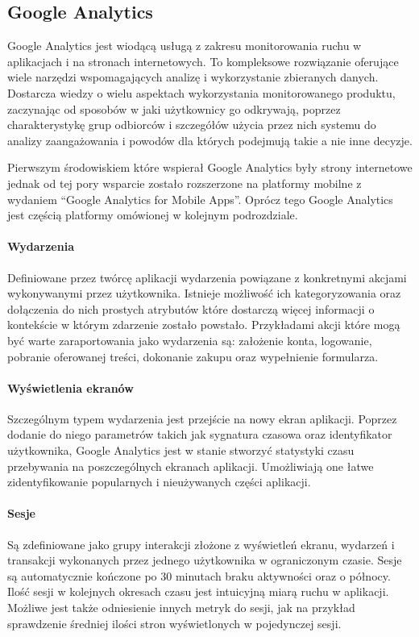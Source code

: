 \subsection{Google Analytics}
\label{sec:ga}
Google Analytics jest wiodącą usługą z zakresu monitorowania ruchu w aplikacjach i na stronach internetowych. To kompleksowe rozwiązanie oferujące wiele narzędzi wspomagających analizę i wykorzystanie zbieranych danych. Dostarcza wiedzy o wielu aspektach wykorzystania monitorowanego produktu, zaczynając od sposobów w jaki użytkownicy go odkrywają, poprzez charakterystykę grup odbiorców i szczegółów użycia przez nich systemu do analizy zaangażowania i powodów dla których podejmują takie a nie inne decyzje.

Pierwszym środowiskiem które wspierał Google Analytics były strony internetowe jednak od tej pory wsparcie zostało rozszerzone na platformy mobilne z wydaniem ``Google Analytics for Mobile Apps''. Oprócz tego Google Analytics jest częścią platformy  omówionej w kolejnym podrozdziale.

\paragraph{Wydarzenia}
\label{par:ga-events}
Definiowane przez twórcę aplikacji wydarzenia powiązane z konkretnymi akcjami wykonywanymi przez użytkownika. Istnieje możliwość ich kategoryzowania oraz dołączenia do nich prostych atrybutów które dostarczą więcej informacji o kontekście w którym zdarzenie zostało powstało. Przykładami akcji które mogą być warte zaraportowania jako wydarzenia są: założenie konta, logowanie, pobranie oferowanej treści, dokonanie zakupu oraz wypełnienie formularza.

\paragraph{Wyświetlenia ekranów}
Szczególnym typem wydarzenia jest przejście na nowy ekran aplikacji. Poprzez dodanie do niego parametrów takich jak sygnatura czasowa oraz identyfikator użytkownika, Google Analytics jest w stanie stworzyć statystyki czasu przebywania na poszczególnych ekranach aplikacji. Umożliwiają one łatwe zidentyfikowanie popularnych i nieużywanych części aplikacji.

\paragraph{Sesje}
Są zdefiniowane jako grupy interakcji złożone z wyświetleń ekranu, wydarzeń i transakcji wykonanych przez jednego użytkownika w ograniczonym czasie. Sesje są automatycznie kończone po 30 minutach braku aktywności oraz o północy. Ilość sesji w kolejnych okresach czasu jest intuicyjną miarą ruchu w aplikacji. Możliwe jest także odniesienie innych metryk do sesji, jak na przykład sprawdzenie średniej ilości stron wyświetlonych w pojedynczej sesji.

